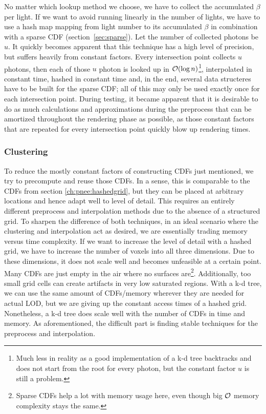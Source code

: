 No matter which lookup method we choose, we have to collect the accumulated $\beta$ per light. If we want to avoid running linearly in the number of lights, we have to use a hash map mapping from light number to its accumulated $\beta$ in combination with a sparse CDF (section~\ref{sec:sparse}). Let the number of collected photons be $u$. It quickly becomes apparent that this technique has a high level of precision, but suffers heavily from constant factors. Every intersection point collects $u$ photons, then each of those $u$ photon is looked up in $\mathcal{O}(\log n)$\footnote{Much less in reality as a good implementation of a k-d tree backtracks and does not start from the root for every photon, but the constant factor $u$ is still a problem.}, interpolated in constant time, hashed in constant time and, in the end, several data structeres have to be built for the sparse CDF; all of this may only be used exactly once for each intersection point. During testing, it became apparent that it is desirable to do as much calculations and approximations during the preprocess that can be amortized throughout the rendering phase as possible, as those constant factors that are repeated for every intersection point quickly blow up rendering times.

\subsubsection{Clustering}

To reduce the mostly constant factors of constructing CDFs just mentioned, we try to precompute and reuse those CDFs. In a sense, this is comparable to the CDFs from section \ref{ch:pnee:hashedgrid}, but they can be placed at arbitrary locations and hence adapt well to level of detail. This requires an entirely different preprocess and interpolation methods due to the absence of a structured grid. To sharpen the difference of both techniques, in an ideal scenario where the clustering and interpolation act as desired, we are essentially trading memory versus time complexity. If we want to increase the level of detail with a hashed grid, we have to increase the number of voxels into all three dimensions. Due to these dimensions, it does not scale well and becomes unfeasible at a certain point. Many CDFs are just empty in the air where no surfaces are\footnote{Sparse CDFs help a lot with memory usage here, even though big $\mathcal{O}$ memory complexity stays the same.}. Additionally, too small grid cells can create artifacts in very low saturated regions. With a k-d tree, we can use the same amount of CDFs/memory wherever they are needed for actual LOD, but we are giving up the constant access times of a hashed grid. Nonetheless, a k-d tree does scale well with the number of CDFs in time and memory. As aforementioned, the difficult part is finding stable techniques for the preprocess and interpolation.

